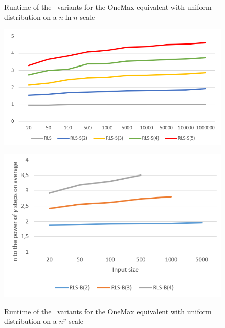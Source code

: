 \begin{figure}[h]
      \centering
      \begin{minipage}[b]{0.45\textwidth}
            \caption{Runtime of the \RLSR~variants for the OneMax equivalent with uniform distribution on a $n\ln n$ scale}
            \includegraphics[width=\textwidth]{figures/images/oneMaxUniformMultipleN_RLSRCompare.png}\label{fig:onemaxniformNlogNBoundRLSR}
      \end{minipage}
      \hspace{0.75cm}
      \begin{minipage}[b]{0.45\textwidth}
            \caption{Runtime of the \RLSN~variants for the OneMax equivalent with uniform distribution on a $n^y$ scale}
            \includegraphics[width=\textwidth]{figures/images/oneMaxUniformMultipleN_RLSBCompare.png}\label{fig:onemaxniformNlogNBoundRLSB}
      \end{minipage}
\end{figure}

